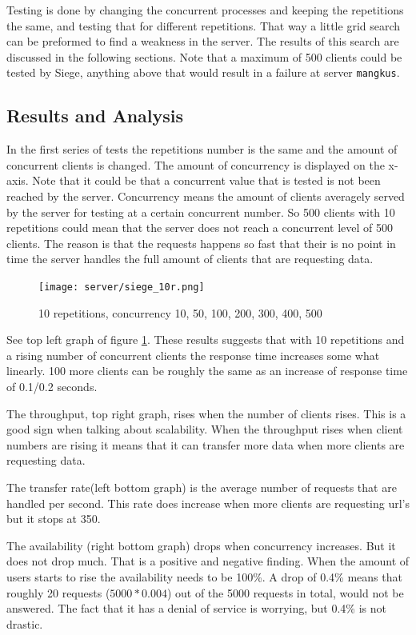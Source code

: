Testing is done by changing the concurrent processes and keeping the repetitions the same, and testing that for different repetitions.  That way a little grid search can be preformed to find a weakness in the server. The results of this search are discussed in the following sections. Note that a maximum of 500 clients could be tested by Siege, anything above that would result in a failure at server \texttt{mangkus}. 

\subsection{Results and Analysis}
In the first series of tests the repetitions number is the same and the amount of concurrent clients is changed. The amount of concurrency is displayed on the x-axis. Note that it could be that a concurrent value that is tested is not been reached by the server. Concurrency means the amount of clients averagely served by the server for testing at a certain concurrent number. So 500 clients with 10 repetitions could mean that the server does not reach a concurrent level of 500 clients. The reason is that the requests happens so fast that their is no point in time the server handles the full amount of clients that are requesting data.
\begin{figure}[H]
\center
\texttt{[image: server/siege\_10r.png]}
\caption{10 repetitions, concurrency 10, 50, 100, 200, 300, 400, 500}
\label{fig:10r}
\end{figure}
See top left graph of figure \ref{fig:10r}. These results suggests that with 10 repetitions and a rising number of concurrent clients the response time increases some what linearly.  100 more clients can be roughly the same as an increase of response time of 0.1/0.2 seconds. 

The throughput, top right graph, rises when the number of clients rises. This is a good sign when talking about scalability. When the throughput rises when client numbers are rising it means that it can transfer more data when more clients are requesting data. 

The transfer rate(left bottom graph) is the average number of requests that are handled per second. This rate does increase when more clients are requesting url's but it stops at 350.

The availability (right bottom graph) drops when concurrency increases. But it does not drop much. That is a positive and negative finding. When the amount of users starts to rise the availability needs to be 100\%. A drop of 0.4\% means that roughly 20 requests ($5000 * 0.004$) out of the 5000 requests in total, would not be answered. The fact that it has a denial of service is worrying, but 0.4\% is not drastic.	

